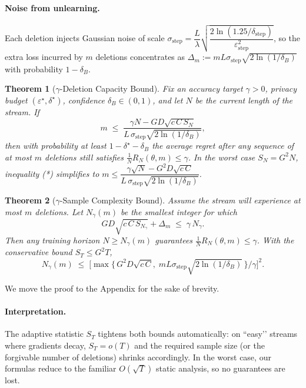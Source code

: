 \documentclass[a4paper,12pt]{article}
\newtheorem{theorem}{Theorem}[section]
\begin{document}
\paragraph{Noise from unlearning.}
Each deletion injects Gaussian noise of scale
$
  \sigma_{\text{step}}
  =\dfrac{L}{\lambda}\sqrt{\dfrac{2\ln(1.25/\delta_{\text{step}})}{\varepsilon_{\text{step}}^{2}}}
$,
so the extra loss incurred by \(m\) deletions concentrates as
$
  \Delta_m
  := mL\sigma_{\text{step}}\sqrt{2\ln(1/\delta_{B})}
$
with probability $1-\delta_{B}$.

\begin{theorem}[$\gamma$-Deletion Capacity Bound]
\label{thm:gamma-adapt-capacity}
Fix an accuracy target \(\gamma>0\), privacy budget
\((\varepsilon^\star,\delta^\star)\), confidence \(\delta_B\in(0,1)\),
and let \(N\) be the current length of the stream.
If
\[
  m
  \;\le\;
  \frac{\gamma N - G D\sqrt{c\,C\,S_N}}
       {L\,\sigma_{\text{step}}\sqrt{2\ln(1/\delta_B)}},
  \tag{*}
\]
then with probability at least \(1-\delta^\star-\delta_B\) the average regret
after any sequence of at most \(m\) deletions still satisfies
\(\tfrac{1}{N}R_N(\theta,m)\le\gamma\).
In the worst case \(S_N=G^{2}N\), inequality (*) simplifies to
\(m \le \dfrac{\gamma\sqrt{N}-G^{2}D\sqrt{c\,C}}%
                {L\,\sigma_{\text{step}}\sqrt{2\ln(1/\delta_B)}}\).
\end{theorem}

\begin{theorem}[$\gamma$-Sample Complexity Bound]
\label{thm:gamma-adapt-sample}
Assume the stream will experience at most \(m\) deletions.
Let $N_\gamma(m)$ be the smallest integer for which
$$
  G D\sqrt{c\,C\,S_{N_\gamma}} + \Delta_m
  \;\le\;
  \gamma\,N_\gamma .
$$
Then any training horizon $N\ge N_\gamma(m)$ guarantees
$\tfrac{1}{N}R_{N}(\theta,m)\le\gamma$.
With the conservative bound $S_{T}\le G^{2}T$,
$$
  N_\gamma(m)
  \;\le\;
  \bigl[\max\{\,G^{2}D\sqrt{c\,C},\;
               mL\sigma_{\text{step}}\sqrt{2\ln(1/\delta_B)}\,\}/\gamma\bigr]^{2}.
$$
\end{theorem}

We move the proof to the Appendix for the sake of brevity.

\paragraph{Interpretation.}
The adaptive statistic $S_T$ tightens both bounds automatically:
on “easy’’ streams where gradients decay, $S_T=o(T)$ and the required
sample size (or the forgivable number of deletions) shrinks
accordingly.  In the worst case, our formulas reduce to the familiar
$O(\sqrt{T})$ static analysis, so no guarantees are lost.
\end{document}
